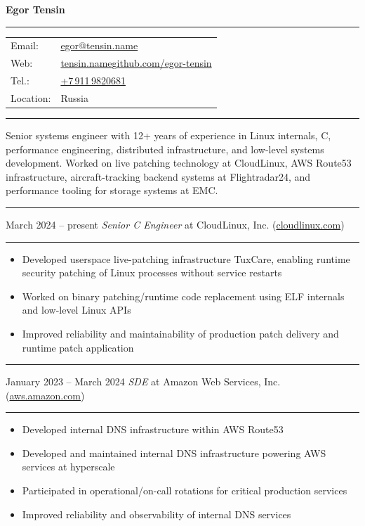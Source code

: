 \documentclass[12pt]{article}
\makeatletter
\newcommand\CvName{Egor Tensin}
\newcommand\CvEmail{egor@tensin.name}
\newcommand\CXX{C\nolinebreak[4]\hspace{-.05em}\raisebox{.4ex}{\relsize{-3}{\textbf{++}}}}
\newcommand\CvSmallSkipLength{0.5em}
\newcommand\CvBigSkipLength{1em}
\newcommand\CvSkip[1]{\vspace{#1}}
\newcommand\CvSmallSkip{\CvSkip{\CvSmallSkipLength}}
\newcommand\CvBigSkip{\CvSkip{\CvBigSkipLength}}
\newcommand\CvRule{\begingroup\color{CvRuleColor}\hrule\endgroup}
\newcommand\CvWorkplaceHeader[5]{
  \begingroup%
    \CvRule\nopagebreak%
    \fboxsep0pt%
    \colorbox{CvWorkplaceHeaderColor}{%
      \begin{minipage}{\linewidth-2\fboxsep}%
\CvSmallSkip%
#1 -- #2 \hfill \textit{#3} at #4 (\href{http://#5/}{#5})%
\CvSmallSkip%
      \end{minipage}%
    }%
    \CvRule%
  \endgroup%
}
\newenvironment{CvWorkplaceDescription}{%
    \begingroup\setlength\parskip{\CvSmallSkipLength}%
  }{%
    \CvSmallSkip\endgroup%
  }
\makeatother
\begin{document}
{\bfseries\Large \CvName}
\CvBigSkip
\CvRule
\CvSmallSkip
\begin{tabularx}{\textwidth}{@{}lX}
Email: & \href{mailto:\CvEmail}{\CvEmail} \\
Web: & \href{https://tensin.name/}{tensin.name}\enspace{}\textopenbullet{}\enspace{}\href{https://github.com/egor-tensin}{github.com/egor-tensin} \\
Tel.: & \href{https://t.me/egor_tensin}{+7\,911\,9820681} \\
Location: & Russia \\
\end{tabularx}
\CvSmallSkip
\CvRule

\CvBigSkip
Senior systems engineer with 12+ years of experience in Linux internals, \CXX, performance engineering, distributed infrastructure, and low-level systems development.
Worked on live patching technology at CloudLinux, AWS Route53 infrastructure, aircraft-tracking backend systems at Flightradar24, and performance tooling for storage systems at EMC.
\CvBigSkip

\CvWorkplaceHeader{March 2024}{present}{Senior {\CXX} Engineer}{CloudLinux, Inc.}{cloudlinux.com}

\begin{CvWorkplaceDescription}
\begin{itemize}[noitemsep]
  \item Developed userspace live-patching infrastructure TuxCare, enabling runtime security patching of Linux processes without service restarts
  \item Worked on binary patching/runtime code replacement using ELF internals and low-level Linux APIs
  \item Improved reliability and maintainability of production patch delivery and runtime patch application
\end{itemize}
\end{CvWorkplaceDescription}

\CvWorkplaceHeader{January 2023}{March 2024}{SDE}{Amazon Web Services, Inc.}{aws.amazon.com}

\begin{CvWorkplaceDescription}
\begin{itemize}[noitemsep]
  \item Developed internal DNS infrastructure within AWS Route53
  \item Developed and maintained internal DNS infrastructure powering AWS services at hyperscale
  \item Participated in operational/on-call rotations for critical production services
  \item Improved reliability and observability of internal DNS services
\end{itemize}
\end{CvWorkplaceDescription}
\end{document}
